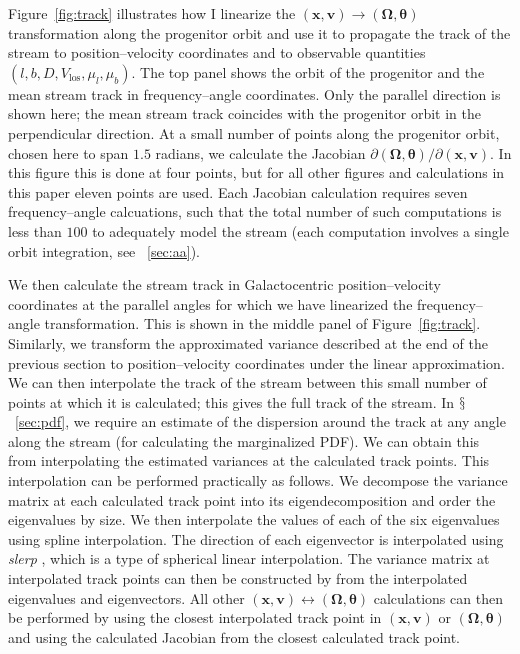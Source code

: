 \documentclass[12pt,preprint]{aastex}
\renewcommand{\figurename}{Figure}
\newcommand{\sectionname}{$\mathsection$}
\renewcommand{\vec}[1]{\ensuremath{\mathbf{#1}}}
\newcommand{\vecx}{\ensuremath{\vec{x}}}
\newcommand{\vecv}{\ensuremath{\vec{v}}}
\newcommand{\veco}{\ensuremath{\vec{\Omega}}}
\newcommand{\veca}{\ensuremath{\boldsymbol\theta}}
\newcommand{\vlos}{\ensuremath{V_{\mathrm{los}}}}
\newcommand{\pmll}{\ensuremath{\mu_l}}
\newcommand{\pmbb}{\ensuremath{\mu_b}}
\begin{document}
\figurename~\ref{fig:track} illustrates how I linearize the
$(\vecx,\vecv) \rightarrow (\veco,\veca)$ transformation along the
progenitor orbit and use it to propagate the track of the stream to
position--velocity coordinates and to observable quantities
$(l,b,D,\vlos,\pmll,\pmbb)$. The top panel shows the orbit of the
progenitor and the mean stream track in frequency--angle
coordinates. Only the parallel direction is shown here; the mean
stream track coincides with the progenitor orbit in the perpendicular
direction. At a small number of points along the progenitor orbit,
chosen here to span $1.5$ radians, we calculate the Jacobian $\partial
(\veco,\veca) / \partial (\vecx,\vecv)$. In this figure this is done
at four points, but for all other figures and calculations in this
paper eleven points are used. Each Jacobian calculation requires seven
frequency--angle calcuations, such that the total number of such
computations is less than $100$ to adequately model the stream (each
computation involves a single orbit integration, see
\appendixname~\ref{sec:aa}). 

We then calculate the stream track in Galactocentric
position--velocity coordinates at the parallel angles for which we
have linearized the frequency--angle transformation. This is shown in
the middle panel of \figurename~\ref{fig:track}. Similarly, we
transform the approximated variance described at the end of the
previous section to position--velocity coordinates under the linear
approximation. We can then interpolate the track of the stream between
this small number of points at which it is calculated; this gives the
full track of the stream. In \sectionname~\ref{sec:pdf}, we require an
estimate of the dispersion around the track at any angle along the
stream (for calculating the marginalized PDF). We can obtain this from
interpolating the estimated variances at the calculated track
points. This interpolation can be performed practically as follows. We
decompose the variance matrix at each calculated track point into its
eigendecomposition and order the eigenvalues by size. We then
interpolate the values of each of the six eigenvalues using spline
interpolation. The direction of each eigenvector is interpolated using
\emph{slerp} \citep{Shoemake85a}, which is a type of spherical linear
interpolation. The variance matrix at interpolated track points can
then be constructed by from the interpolated eigenvalues and
eigenvectors. All other $(\vecx,\vecv) \leftrightarrow (\veco,\veca)$
calculations can then be performed by using the closest interpolated
track point in $(\vecx,\vecv)$ or $(\veco,\veca)$ and using the
calculated Jacobian from the closest calculated track point.
\end{document}

